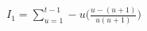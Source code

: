 \documentclass[preview]{standalone}
\begin{document}
\begin{align*}
I_{1}=\sum_{u=1}^{t-1}-u\bigg(\frac{u-(u+1)}{u(u+1)}\bigg)
\end{align*}
\end{document}
